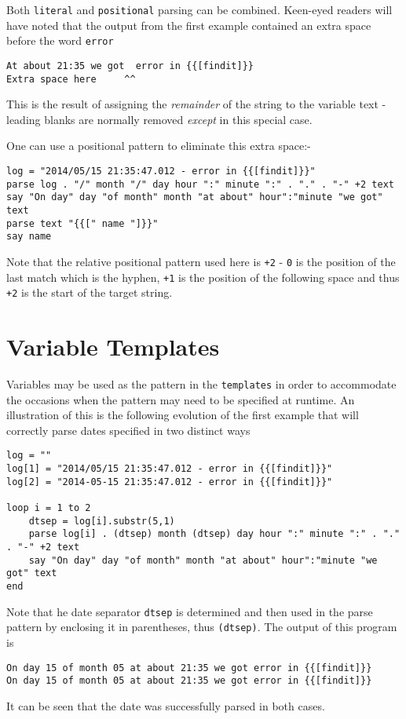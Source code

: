 {Both \texttt{literal} and \texttt{positional} parsing can be combined. Keen-eyed readers will have noted that the output from the first example contained an extra space before the word \texttt{error}
\begin{verbatim}
At about 21:35 we got  error in {{[findit]}} 
Extra space here     ^^
\end{verbatim}
This is the result of assigning the \textit{remainder} of the string to the variable text - leading blanks are normally removed \textit{except} in this special case.

One can use a positional pattern to eliminate this extra space:-
\begin{lstlisting}[label=combinedParsing, caption=Combined Parsing]
log = "2014/05/15 21:35:47.012 - error in {{[findit]}}"
parse log . "/" month "/" day hour ":" minute ":" . "." . "-" +2 text
say "On day" day "of month" month "at about" hour":"minute "we got" text
parse text "{{[" name "]}}"
say name
\end{lstlisting}

Note that the relative positional pattern used here is \texttt{+2} - \texttt{0} is the position of the last match which is the hyphen, \texttt{+1} is the position of the following space and thus \texttt{+2} is the start of the target string. 

\section{Variable Templates}
Variables may be used as the pattern in the \texttt{templates} in order to accommodate the occasions when the pattern may need to be specified at runtime. An illustration of this is the following evolution of the first example that will correctly parse dates specified in two distinct ways
\begin{lstlisting}[label=variablePattern, caption=Variables in Patterns]
log = ""
log[1] = "2014/05/15 21:35:47.012 - error in {{[findit]}}"
log[2] = "2014-05-15 21:35:47.012 - error in {{[findit]}}"

loop i = 1 to 2
	dtsep = log[i].substr(5,1)
	parse log[i] . (dtsep) month (dtsep) day hour ":" minute ":" . "." . "-" +2 text
	say "On day" day "of month" month "at about" hour":"minute "we got" text
end
\end{lstlisting}
Note that he date separator \texttt{dtsep} is determined and then used in the parse pattern by enclosing it in parentheses, thus \texttt{(dtsep)}. The output of this program is
\begin{verbatim}
On day 15 of month 05 at about 21:35 we got error in {{[findit]}} 
On day 15 of month 05 at about 21:35 we got error in {{[findit]}} 
\end{verbatim}
It can be seen that the date was successfully parsed in both cases.

}
